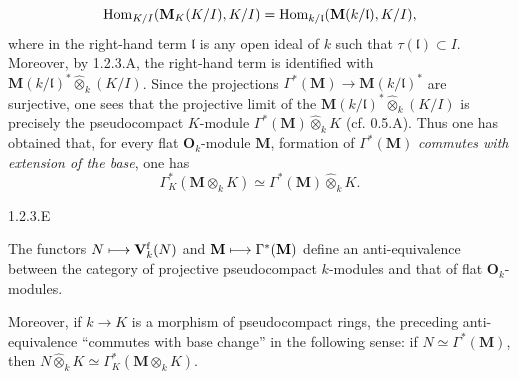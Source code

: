 \[
\operatorname{Hom}_{K/I}(\mathbf M_K(K/I),K/I)=\operatorname{Hom}_{k/\mathfrak l}(\mathbf M(k/\mathfrak l),K/I),
\]
where in the right-hand term $\mathfrak l$ is any open ideal of $k$ such that $\tau(\mathfrak l)\subset I$. Moreover, by 1.2.3.A, the right-hand term is identified with $\mathbf M(k/\mathfrak l)^*\widehat\otimes_k(K/I)$. Since the projections $\Gamma^*(\mathbf M)\to\mathbf M(k/\mathfrak l)^*$ are surjective, one sees that the projective limit of the $\mathbf M(k/\mathfrak l)^*\widehat\otimes_k(K/I)$ is precisely the pseudocompact $K$-module $\Gamma^*(\mathbf M)\widehat\otimes_k K$ (cf. 0.5.A). Thus one has obtained that, for every flat $\mathbf O_k$-module $\mathbf M$, formation of $\Gamma^*(\mathbf M)$ \emph{commutes with extension of the base}, \ie one has
\begin{equation}\tag{$\star$}
\Gamma_K^*(\mathbf M\otimes_k K)\simeq\Gamma^*(\mathbf M)\widehat\otimes_k K.
\end{equation}
\begin{proposition}{1.2.3.E}\label{VIIB.1.2.3.E}
\begin{enumeratei}
\item The functors $N\longmapsto\mathbf V_k^{\mathrm f}(N)$ and $\mathbf M\longmapsto\Gamma^*(\mathbf M)$ define an anti-equivalence between the category of projective pseudocompact $k$-modules and that of flat $\mathbf O_k$-modules.
\item Moreover, if $k\to K$ is a morphism of pseudocompact rings, the preceding anti-equivalence ``commutes with base change'' in the following sense: if $N\simeq\Gamma^*(\mathbf M)$, then $N\widehat\otimes_k K\simeq\Gamma_K^*(\mathbf M\otimes_k K)$.
\end{enumeratei}
\end{proposition}
